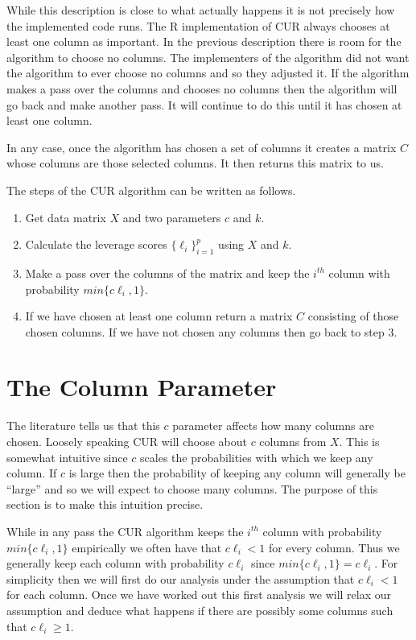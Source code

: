 \documentclass{book}
\begin{document}
While this description is close to what actually happens it is not precisely how the implemented code runs. The R implementation of CUR always chooses at least one column as important. In the previous description there is room for the algorithm to choose no columns. The implementers of the algorithm did not want the algorithm to ever choose no columns and so they adjusted it. If the algorithm makes a pass over the columns and chooses no columns then the algorithm will go back and make another pass. It will continue to do this until it has chosen at least one column. 

In any case, once the algorithm has chosen a set of columns it creates a matrix $C$ whose columns are those selected columns. It then returns this matrix to us. \vspace{.5cm}

The steps of the CUR algorithm can be written as follows. 
\begin{enumerate}
\item Get data matrix $X$ and two parameters $c$ and $k$. 
\item Calculate the leverage scores $\{\ell_i\}_{i=1}^{p}$ using $X$ and $k$.
\item Make a pass over the columns of the matrix and keep the $i^{th}$ column with probability $min\{c\ell_i,1\}$.
\item If we have chosen at least one column return a matrix $C$ consisting of those chosen columns. If we have not chosen any columns then go back to step 3. 
\end{enumerate}

\section{The Column Parameter}

The literature tells us that this $c$ parameter affects how many columns are chosen. Loosely speaking CUR will choose about $c$ columns from $X$. This is somewhat intuitive since $c$ scales the probabilities with which we keep any column. If $c$ is large then the probability of keeping any column will generally be ``large'' and so we will expect to choose many columns. The purpose of this section is to make this intuition precise. 

While in any pass the CUR algorithm keeps the $i^{th}$ column with probability $min\{c\ell_i,1\}$ empirically we often have that $c\ell_i < 1$ for every column. Thus we generally keep each column with probability $c\ell_i$ since $min\{c\ell_i,1\}=c\ell_i$. For simplicity then we will first do our analysis under the assumption that $c\ell_i < 1$ for each column. Once we have worked out this first analysis we will relax our assumption and deduce what happens if there are possibly some columns such that $c\ell_i \geq 1$. 
\end{document}
